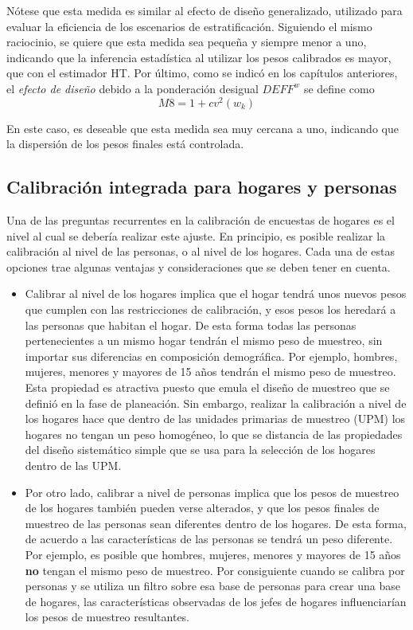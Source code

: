 \documentclass[
  12pt,
]{book}
\begin{document}
Nótese que esta medida es similar al efecto de diseño generalizado, utilizado para evaluar la eficiencia de los escenarios de estratificación. Siguiendo el mismo raciocinio, se quiere que esta medida sea pequeña y siempre menor a uno, indicando que la inferencia estadística al utilizar los pesos calibrados es mayor, que con el estimador HT. Por último, como se indicó en los capítulos anteriores, el \emph{efecto de diseño} debido a la ponderación desigual \(DEFF^w\) se define como
\[
M8 = 1+cv^2(w_k)
\]

En este caso, es deseable que esta medida sea muy cercana a uno, indicando que la dispersión de los pesos finales está controlada.

\hypertarget{calibraciuxf3n-integrada-para-hogares-y-personas}{%
\subsection{Calibración integrada para hogares y personas}\label{calibraciuxf3n-integrada-para-hogares-y-personas}}

Una de las preguntas recurrentes en la calibración de encuestas de hogares es el nivel al cual se debería realizar este ajuste. En principio, es posible realizar la calibración al nivel de las personas, o al nivel de los hogares. Cada una de estas opciones trae algunas ventajas y consideraciones que se deben tener en cuenta.

\begin{itemize}
\item
  Calibrar al nivel de los hogares implica que el hogar tendrá unos nuevos pesos que cumplen con las restricciones de calibración, y esos pesos los heredará a las personas que habitan el hogar. De esta forma todas las personas pertenecientes a un mismo hogar tendrán el mismo peso de muestreo, sin importar sus diferencias en composición demográfica. Por ejemplo, hombres, mujeres, menores y mayores de 15 años tendrán el mismo peso de muestreo. Esta propiedad es atractiva puesto que emula el diseño de muestreo que se definió en la fase de planeación. Sin embargo, realizar la calibración a nivel de los hogares hace que dentro de las unidades primarias de muestreo (UPM) los hogares no tengan un peso homogéneo, lo que se distancia de las propiedades del diseño sistemático simple que se usa para la selección de los hogares dentro de las UPM.
\item
  Por otro lado, calibrar a nivel de personas implica que los pesos de muestreo de los hogares también pueden verse alterados, y que los pesos finales de muestreo de las personas sean diferentes dentro de los hogares. De esta forma, de acuerdo a las características de las personas se tendrá un peso diferente. Por ejemplo, es posible que hombres, mujeres, menores y mayores de 15 años \textbf{no} tengan el mismo peso de muestreo. Por consiguiente cuando se calibra por personas y se utiliza un filtro sobre esa base de personas para crear una base de hogares, las características observadas de los jefes de hogares influenciarían los pesos de muestreo resultantes.
\end{itemize}
\end{document}
